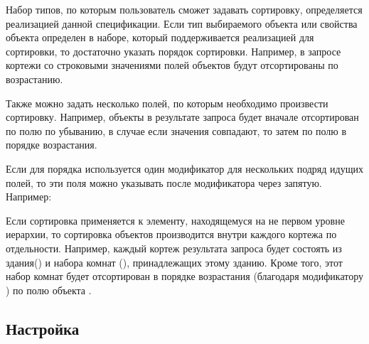 Набор типов, по которым пользователь сможет задавать сортировку,
определяется реализацией данной спецификации.  Если тип выбираемого объекта или свойства объекта
определен в наборе, который поддерживается реализацией для сортировки, то достаточно указать порядок сортировки. 
Например, в запросе 
кортежи со строковыми значениями полей  объектов  будут
отсортированы по возрастанию.

Также можно задать несколько полей, по которым необходимо произвести сортировку. 
Например, объекты  в результате запроса
будет вначале отсортирован по полю  по убыванию, в случае если значения
 совпадают, то затем по полю  в порядке возрастания.

Если для порядка используется один модификатор для нескольких подряд идущих полей, 
то эти поля можно указывать после модификатора через запятую. Например:

Если сортировка применяется к элементу, находящемуся на не первом уровне иерархии, то
сортировка объектов производится внутри каждого кортежа по отдельности. Например, каждый
кортеж результата запроса
будет состоять из здания() и набора комнат (), принадлежащих этому
зданию. Кроме того, этот набор комнат будет отсортирован в порядке возрастания (благодаря
модификатору ) по полю  объекта .




\subsection{Настройка}
